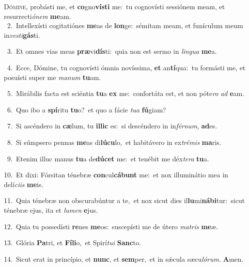 \lettrine{\initial\textcolor{\initialcolor}{D}}{ómine,} probásti me, et \textbf{co}\-gno\-\textbf{vís}\-\textbf{ti} me:~\star tu cognovísti sessiónem meam, et resurrecti\-\textit{ó}\-\textit{nem} \textbf{me}\-am.\\
{\numbfont\textcolor{\numbcolor}{~2.}}~Intellexísti cogitatiónes \textbf{me}\-as de \textbf{lon}\-ge:~\star sémitam meam, et funículum meum in\-\textit{ves}\-\textit{ti}\textbf{gás}ti.\par
{\numbfont\textcolor{\numbcolor}{~3.}}~Et omnes vias meas \textbf{præ}\-vi\-\textbf{dís}\-ti:~\star quia non est sermo in \textit{lin}\-\textit{gua} \textbf{me}\-a.\par
{\numbfont\textcolor{\numbcolor}{~4.}}~Ecce, Dómine, tu cognovísti ómnia novíssima, \textbf{et} an\-\textbf{tí}\-qua:~\star tu formásti me, et posuísti super me \textit{ma}\-\textit{num} \textbf{tu}\-am.\par
{\numbfont\textcolor{\numbcolor}{~5.}}~Mirábilis facta est sciéntia \textbf{tu}\-a \textbf{ex} me:~\star confortáta est, et non póte\textit{ro} \textit{ad} \textbf{e}\-am.\par
{\numbfont\textcolor{\numbcolor}{~6.}}~Quo ibo a \textbf{spí}\-ritu \textbf{tu}\-o?~\star et quo a fácie \textit{tu}\-\textit{a} \textbf{fú}\-giam?\par
{\numbfont\textcolor{\numbcolor}{~7.}}~Si ascéndero in \textbf{cæ}\-lum, tu \textbf{il}\-\textbf{lic} es:~\star si descéndero in in\-\textit{fér}\-\textit{num}, \textbf{ad}\-es.\par
{\numbfont\textcolor{\numbcolor}{~8.}}~Si súmpsero pennas \textbf{me}\-as di\-\textbf{lú}\-\textbf{cu}lo,~\star et habitávero in ex\-\textit{tré}\-\textit{mis} \textbf{ma}\-ris.\par
{\numbfont\textcolor{\numbcolor}{~9.}}~Etenim illuc manus \textbf{tu}\-a de\-\textbf{dú}\-\textbf{cet} me:~\star et tenébit me déx\-\textit{te}\-\textit{ra} \textbf{tu}\-a.\par
{\numbfont\textcolor{\numbcolor}{10.}}~Et dixi: Fórsitan ténebræ \textbf{con}\-cul\-\textbf{cá}\-\textbf{bunt} me:~\star et nox illuminátio mea in delí\-\textit{ci}\-\textit{is} \textbf{me}\-is.\par
{\numbfont\textcolor{\numbcolor}{11.}}~Quia ténebræ non obscurabúntur a te,~\dagger et nox sicut dies il\-\textbf{lu}\-mi\-\textbf{ná}\-\textbf{bi}tur:~\star sicut ténebræ ejus, ita et \textit{lu}\-\textit{men} \textbf{e}\-jus.\par
{\numbfont\textcolor{\numbcolor}{12.}}~Quia tu possedísti \textbf{re}\-nes \textbf{me}\-os:~\star suscepísti me de útero \textit{ma}\-\textit{tris} \textbf{me}\-æ.\par
{\numbfont\textcolor{\numbcolor}{13.}}~Glória \textbf{Pa}\-tri, et \textbf{Fí}\-\textbf{li}o,~\star et Spirí\-\textit{tu}\-\textit{i} \textbf{Sanc}\-to.\par
{\numbfont\textcolor{\numbcolor}{14.}}~Sicut erat in princípio, et \textbf{nunc}\-, et \textbf{sem}\-per,~\star et in sǽcula sæcu\-\textit{ló}\-\textit{rum}. \textbf{A}\-men.\par
